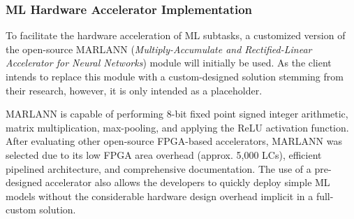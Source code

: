 \subsubsection{ML Hardware Accelerator Implementation}
To facilitate the hardware acceleration of ML subtasks, a customized version of the open-source MARLANN (\textit{Multiply-Accumulate and Rectified-Linear Accelerator for Neural Networks}) module will initially be used. As the client intends to replace this module with a custom-designed solution stemming from their research, however, it is only intended as a placeholder.

MARLANN is capable of performing 8-bit fixed point signed integer arithmetic, matrix multiplication, max-pooling, and applying the ReLU activation function. After evaluating other open-source FPGA-based accelerators, MARLANN was selected due to its low FPGA area overhead (approx. 5,000 LCs), efficient pipelined architecture, and comprehensive documentation. The use of a pre-designed accelerator also allows the developers to quickly deploy simple ML models without the considerable hardware design overhead implicit in a full-custom solution.
